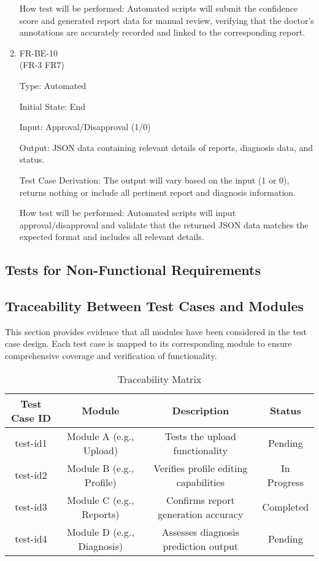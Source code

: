 \documentclass[12pt, titlepage]{article}
\begin{document}
\begin{enumerate}
How test will be performed: Automated scripts will submit the confidence score and generated report data for manual review, verifying that the doctor’s annotations are accurately recorded and linked to the corresponding report.

\item{FR-BE-10\\} (FR-3 FR7)

Type: Automated 
					
Initial State: End
					
Input: Approval/Disapproval (1/0)
					
Output: JSON data containing relevant details of reports, diagnosis data, and status.

Test Case Derivation: The output will vary based on the input (1 or 0), returns nothing or include all pertinent report and diagnosis information.

How test will be performed: Automated scripts will input approval/disapproval and validate that the returned JSON data matches the expected format and includes all relevant details.

\end{enumerate}
\subsection{Tests for Non-Functional Requirements}

\subsection{Traceability Between Test Cases and Modules}
This section provides evidence that all modules have been considered in the test case design. Each test case is mapped to its corresponding module to ensure comprehensive coverage and verification of functionality.

\begin{landscape}
\begin{table}[h]
    \centering
    \caption{Traceability Matrix}
    \begin{tabular}{|c|c|c|c|}
        \hline
        \textbf{Test Case ID} & \textbf{Module} & \textbf{Description} & \textbf{Status} \\
        \hline
        test-id1 & Module A (e.g., Upload) & Tests the upload functionality & Pending \\
        \hline
        test-id2 & Module B (e.g., Profile) & Verifies profile editing capabilities & In Progress \\
        \hline
        test-id3 & Module C (e.g., Reports) & Confirms report generation accuracy & Completed \\
        \hline
        test-id4 & Module D (e.g., Diagnosis) & Assesses diagnosis prediction output & Pending \\
        \hline
    \end{tabular}
\end{table}
\end{landscape}
\end{document}
